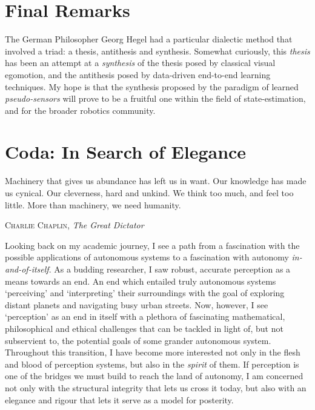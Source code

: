\section{Final Remarks}

The German Philosopher Georg Hegel had a particular dialectic method that involved a triad: a thesis, antithesis and synthesis.
Somewhat curiously, this \textit{thesis} has been an attempt at a \textit{synthesis} of the thesis posed by classical visual egomotion, and the antithesis posed by data-driven end-to-end learning techniques.
My hope is that the synthesis proposed by the paradigm of learned \textit{pseudo-sensors} will prove to be a fruitful one within the field of state-estimation, and for the broader robotics community. 

\section{Coda: In Search of Elegance}
\epigraph{Machinery that gives us abundance has left us in want.
Our knowledge has made us cynical.
Our cleverness, hard and unkind.
We think too much, and feel too little.
More than machinery, we need humanity.}{\textsc{Charlie Chaplin}, \textit{The Great Dictator}}


Looking back on my academic journey, I see a path from a fascination with the possible applications of autonomous systems to a fascination with autonomy \textit{in-and-of-itself}. As a budding researcher, I saw robust, accurate perception as a means towards an end. An end which entailed truly autonomous systems `perceiving' and `interpreting' their surroundings with the goal of exploring distant planets and navigating busy urban streets. Now, however, I see `perception' as an end in itself with a plethora of fascinating mathematical, philosophical and ethical challenges that can be tackled in light of, but not subservient to, the potential goals of some grander autonomous system. Throughout this transition, I have become more interested not only in the flesh and blood of perception systems, but also in the \textit{spirit} of them. If perception is one of the bridges we must build to reach the land of autonomy, I am concerned not only with the structural integrity that lets us cross it today, but also with an elegance and rigour that lets it serve as a model for posterity. 

